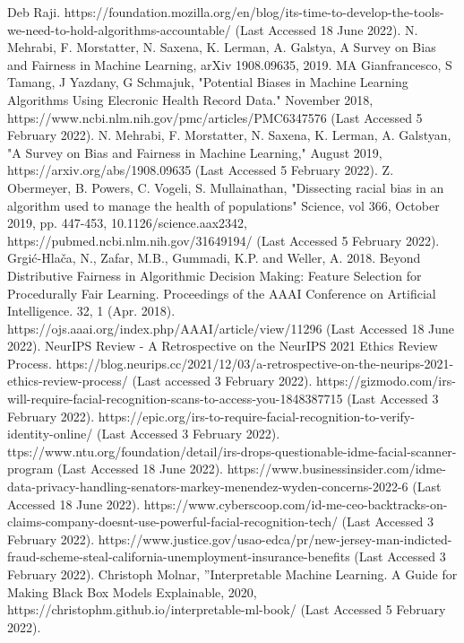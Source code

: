 \documentclass[conference]{IEEEtran}
\begin{document}
\begin{thebibliography}{00}
 Deb Raji. https://foundation.mozilla.org/en/blog/its-time-to-develop-the-tools-we-need-to-hold-algorithms-accountable/ (Last Accessed 18 June 2022).
 N. Mehrabi, F. Morstatter, N. Saxena, K. Lerman, A. Galstya, A Survey on Bias and Fairness in Machine Learning, arXiv 1908.09635, 2019.
 MA Gianfrancesco, S Tamang, J Yazdany, G Schmajuk, "Potential Biases in Machine Learning Algorithms Using Elecronic Health Record Data." November 2018, https://www.ncbi.nlm.nih.gov/pmc/articles/PMC6347576 (Last Accessed 5 February 2022).
 N. Mehrabi, F. Morstatter, N. Saxena, K. Lerman, A. Galstyan, "A Survey on Bias and Fairness in Machine Learning," August 2019, https://arxiv.org/abs/1908.09635 (Last Accessed 5 February 2022).
 Z. Obermeyer, B. Powers, C. Vogeli, S. Mullainathan, "Dissecting racial bias in an algorithm used to manage the health of populations" Science, vol 366, October 2019, pp. 447-453, 10.1126/science.aax2342, https://pubmed.ncbi.nlm.nih.gov/31649194/ (Last Accessed 5 February 2022).
 Grgić-Hlača, N., Zafar, M.B., Gummadi, K.P. and Weller, A. 2018. Beyond Distributive Fairness in Algorithmic Decision Making: Feature Selection for Procedurally Fair Learning. Proceedings of the AAAI Conference on Artificial Intelligence. 32, 1 (Apr. 2018). https://ojs.aaai.org/index.php/AAAI/article/view/11296 (Last Accessed 18 June 2022).
 NeurIPS Review - A Retrospective on the NeurIPS 2021 Ethics Review Process. https://blog.neurips.cc/2021/12/03/a-retrospective-on-the-neurips-2021-ethics-review-process/ (Last accessed 3 February 2022).
 https://gizmodo.com/irs-will-require-facial-recognition-scans-to-access-you-1848387715 (Last Accessed 3 February 2022).
 https://epic.org/irs-to-require-facial-recognition-to-verify-identity-online/ (Last Accessed 3 February 2022).
 ttps://www.ntu.org/foundation/detail/irs-drops-questionable-idme-facial-scanner-program (Last Accessed 18 June 2022).
 https://www.businessinsider.com/idme-data-privacy-handling-senators-markey-menendez-wyden-concerns-2022-6 (Last Accessed 18 June 2022).
 https://www.cyberscoop.com/id-me-ceo-backtracks-on-claims-company-doesnt-use-powerful-facial-recognition-tech/ (Last Accessed 3 February 2022).
 https://www.justice.gov/usao-edca/pr/new-jersey-man-indicted-fraud-scheme-steal-california-unemployment-insurance-benefits (Last Accessed 3 February 2022).
 Christoph Molnar, ''Interpretable Machine Learning. A Guide for Making Black Box Models Explainable, 2020, https://christophm.github.io/interpretable-ml-book/ (Last Accessed 5 February 2022).

\end{thebibliography}
\end{document}
